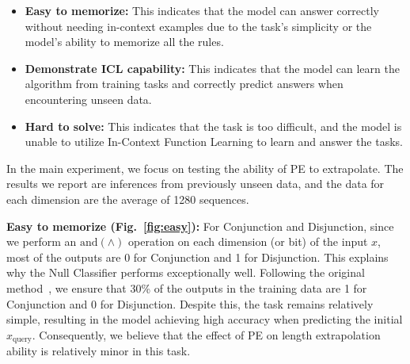 \documentclass[letterpaper]{article} %
\begin{document}
\begin{itemize}
    \item \textbf{Easy to memorize:} This indicates that the model can answer correctly without needing in-context examples due to the task's simplicity or the model's ability to memorize all the rules.
    \item \textbf{Demonstrate ICL capability:} This indicates that the model can learn the algorithm from training tasks and correctly predict answers when encountering unseen data.
    \item \textbf{Hard to solve:} This indicates that the task is too difficult, and the model is unable to utilize In-Context Function Learning to learn and answer the tasks.
\end{itemize}

In the main experiment, we focus on testing the ability of PE to extrapolate. The results we report are inferences from previously unseen data, and the data for each dimension are the average of 1280 sequences. 

\textbf{Easy to memorize (Fig.~\ref{fig:easy}):} For Conjunction and Disjunction, since we perform an $\text{and}(\wedge)$ operation on each dimension (or bit) of the input $x$, most of the outputs are 0 for Conjunction and 1 for Disjunction. This explains why the Null Classifier performs exceptionally well. Following the original method~\cite{bhattamishra-2024-understanding}, we ensure that 30\% of the outputs in the training data are 1 for Conjunction and 0 for Disjunction. Despite this, the task remains relatively simple, resulting in the model achieving high accuracy when predicting the initial $x_{\text{query}}$. Consequently, we believe that the effect of PE on length extrapolation ability is relatively minor in this task.
\end{document}
